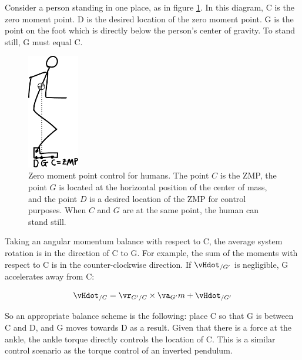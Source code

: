 Consider a person standing in one place, as in figure \ref{fig:ZMPPerson}. In this diagram, C is the zero moment point. D is the desired location of the zero moment point. G is the point on the foot which is directly below the person's center of gravity. To stand still, G must equal C.

\begin{figure}[h]		%
\begin{centering}
\includegraphics[width=0.2\textwidth]{Figures/ZMPPerson}\par
\end{centering}
\caption[Diagram: Zero Moment Point Control for Humans]{Zero moment point control for humans. The point $C$ is the ZMP, the point $G$ is located at the horizontal position of the center of mass, and the point $D$ is a desired location of the ZMP for control purposes. When $C$ and $G$ are at the same point, the human can stand still.}
\label{fig:ZMPPerson}
\end{figure}
%

Taking an angular momentum balance with respect to C, the average system rotation is in the direction of C to G. For example, the sum of the moments with respect to C is in the counter-clockwise direction. If $\vHdot_{/G'}$ is negligible, G accelerates away from C:

\begin{equation}
\vHdot_{/C}=\vr_{G'/C}\times\va_{G'}m+\vHdot_{/G'}
\label{eq:ZMPAMB}
\end{equation}

So an appropriate balance scheme is the following: place C so that G is between C and D, and G moves towards D as a result. Given that there is a force at the ankle, the ankle torque directly controls the location of C. This is a similar control scenario as the torque control of an inverted pendulum. 


